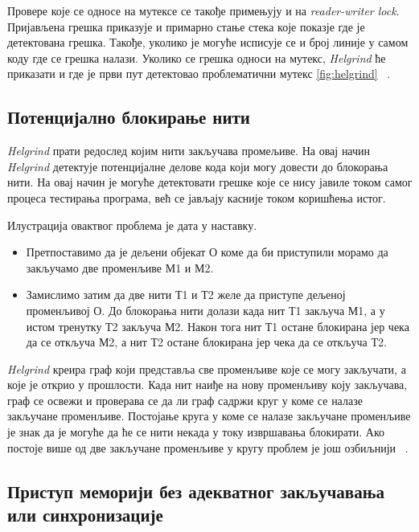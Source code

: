 \documentclass[12pt,oneside]{memoir}
\begin{document}
\indent Провере које се односе на мутексе се такође примењују и на \textit{reader-writer lock}. Пријављена грешка приказује и примарно стање стека које показје где је детектована грешка. Такође, уколико је могуће исписује се и број линије у самом коду где се грешка налази. Уколико се грешка односи на мутекс, \textit{Helgrind} ће приказати и где је први пут детектовао проблематични мутекс \ref{fig:helgrind} ~\cite{helgrindRef}. 

\subsection{Потенцијално блокирање нити}

\indent \textit{Helgrind} прати редослед којим нити закључава промељиве. На овај начин \textit{Helgrind} детектује потенцијалне делове кода који могу довести до блокорања нити. На овај начин је могуће детектовати грешке које се нису јавиле током самог процеса тестирања програма, већ се јављају касније током коришћења истог.

\indent Илустрација овактвог проблема је дата у наставку.

\begin{itemize}
  \item Претпоставимо да је дељени објекат О коме да би приступили морамо да закључамо две променљиве М1 и М2.
  \item  Замислимо затим да две нити Т1 и Т2 желе да приступе дељеној променљивој О. До блокорања нити долази када нит Т1 закључа М1, а у истом тренутку Т2 закључа М2. Након тога нит Т1 остане блокирана јер чека да се откључа М2, а нит Т2 остане блокирана јер чека да се откључа Т2.
\end{itemize}


\indent \textit{Helgrind} креира граф који представља све променљиве које се могу закључати, а које је открио у прошлости. Када нит наиђе на нову променљиву коју закључава, граф се освежи и проверава се да ли граф садржи круг у коме се налазе закључане променљиве. Постојање круга у коме се налазе закључане променљиве је знак да је могуће да ће се нити некада у току извршавања блокирати. Ако постоје више од две закључане променљиве у кругу проблем је још озбиљнији ~\cite{helgrindRef}.


\subsection{Приступ меморији без адекватног закључавања или синхронизације}
\end{document}
